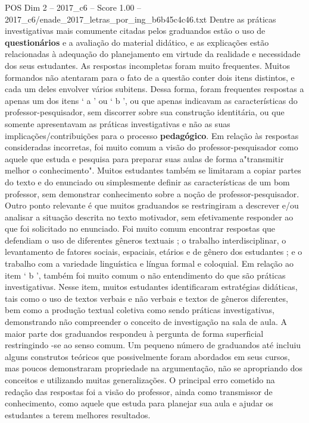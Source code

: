 \begin{textsample}{POS Dim 2 – 2017\_c6 – Score 1.00 – 2017\_c6/enade\_2017\_letras\_por\_ing\_b6b45c4c46.txt}
Dentre as práticas investigativas mais comumente citadas pelos graduandos estão o uso de \textbf{questionários} e a avaliação do material didático, e as explicações estão relacionadas à adequação do planejamento em virtude da realidade e necessidade dos seus estudantes.
As respostas incompletas foram muito frequentes.
Muitos formandos não atentaram para o fato de a questão conter dois itens distintos, e cada um deles envolver vários subitens.
Dessa forma, foram frequentes respostas a apenas um dos itens ‘ a ’ ou ‘ b ’, ou que apenas indicavam as características do professor-pesquisador, sem discorrer sobre sua construção identitária, ou que somente apresentavam as práticas investigativas e não as suas implicações/contribuições para o processo \textbf{pedagógico}.
Em relação às respostas consideradas incorretas, foi muito comum a visão do professor-pesquisador como aquele que estuda e pesquisa para preparar suas aulas de forma a"transmitir melhor o conhecimento".
Muitos estudantes também se limitaram a copiar partes do texto e do enunciado ou simplesmente definir as características de um bom professor, sem demonstrar conhecimento sobre a noção de professor-pesquisador.
Outro ponto relevante é que muitos graduandos se restringiram a descrever e/ou analisar a situação descrita no texto motivador, sem efetivamente responder ao que foi solicitado no enunciado.
Foi muito comum encontrar respostas que defendiam o uso de diferentes gêneros textuais ; o trabalho interdisciplinar, o levantamento de fatores sociais, espaciais, etários e de gênero dos estudantes ; e o trabalho com a variedade linguística e língua formal e coloquial.
Em relação ao item ‘ b ’, também foi muito comum o não entendimento do que são práticas investigativas.
Nesse item, muitos estudantes identificaram estratégias didáticas, tais como o uso de textos verbais e não verbais e textos de gêneros diferentes, bem como a produção textual coletiva como sendo práticas investigativas, demonstrando não compreender o conceito de investigação na sala de aula.
A maior parte dos graduandos respondeu à pergunta de forma superficial restringindo -se ao senso comum.
Um pequeno número de graduandos até incluiu alguns construtos teóricos que possivelmente foram abordados em seus cursos, mas poucos demonstraram propriedade na argumentação, não se apropriando dos conceitos e utilizando muitas generalizações.
O principal erro cometido na redação das respostas foi a visão do professor, ainda como transmissor de conhecimento, como aquele que estuda para planejar sua aula e ajudar os estudantes a terem melhores resultados.

\end{textsample}
